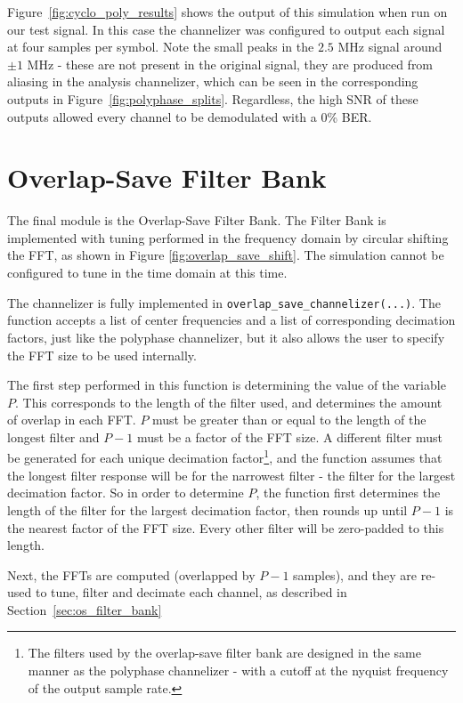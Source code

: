 \documentclass[12pt]{report}
\begin{document}
Figure~\ref{fig:cyclo_poly_results} shows the output of this simulation when
run on our test signal. In this case the channelizer was configured to output
each signal at four samples per symbol. Note the small peaks in the $2.5$ MHz
signal around $\pm1$ MHz - these are not present in the original signal, they
are produced from aliasing in the analysis channelizer, which can be seen in
the corresponding outputs in Figure~\ref{fig:polyphase_splits}. Regardless, the
high SNR of these outputs allowed every channel to be demodulated with a 0\%
BER.

\section{Overlap-Save Filter Bank}
\label{sec:sim_os}
The final module is the Overlap-Save Filter Bank. The Filter Bank is
implemented with tuning performed in the frequency domain by circular shifting
the FFT, as shown in Figure \ref{fig:overlap_save_shift}. The
simulation cannot be configured to tune in the time domain at this time.

The channelizer is fully implemented in \texttt{overlap\_save\_channelizer(...)}.
The function accepts a list of center frequencies and a list of corresponding decimation factors, just like the polyphase channelizer, but it also allows the user to specify the FFT size to be used internally.

The first step performed in this function is determining the value of the
variable $P$. This corresponds to the length of the filter used, and determines
the amount of overlap in each FFT. $P$ must be greater than or equal to the
length of the longest filter and $P-1$ must be a factor of the FFT size.
A different filter must be generated for each unique decimation
factor\footnote{The filters used by the overlap-save filter bank are designed
    in the same manner as the polyphase channelizer - with a cutoff at the
nyquist frequency of the output sample rate.}, and the function assumes that
the longest filter response will be for the narrowest filter - the filter for
the largest decimation factor. So in order to determine $P$, the function first
determines the length of the filter for the largest decimation factor, then
rounds up until $P-1$ is the nearest factor of the FFT size. Every other filter
will be zero-padded to this length.

Next, the FFTs are computed (overlapped by $P-1$ samples), and they are re-used
to tune, filter and decimate each channel, as described in
Section~\ref{sec:os_filter_bank}
\end{document}
